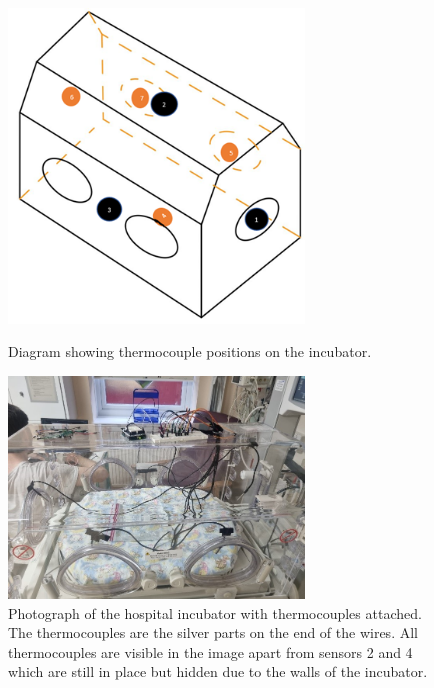 \documentclass{article}
\begin{document}
\begin{figure}[h!]
\centering
\begin{minipage}{.45\linewidth}
    \captionsetup{justification=centering,margin=0.5cm}
    \centering{}
    \includegraphics[width=0.7\textwidth]{modelSketchPic.png}
    \caption{Diagram showing thermocouple positions on the incubator.}
    \label{modelSketchPic}
\end{minipage}
\hfill
\begin{minipage}{.5\linewidth}
    \captionsetup{justification=centering,margin=0.3cm}
    \centering{}
    \includegraphics[width=0.7\textwidth]{hospitalModelPic.jpg}
    \caption{Photograph of the hospital incubator with thermocouples attached. The thermocouples are the silver parts on the end of the wires. All thermocouples are visible in the image apart from sensors 2 and 4 which are still in place but hidden due to the walls of the incubator.}
    \label{hospitalModelPic}
    \end{minipage}
\end{figure}
\end{document}
